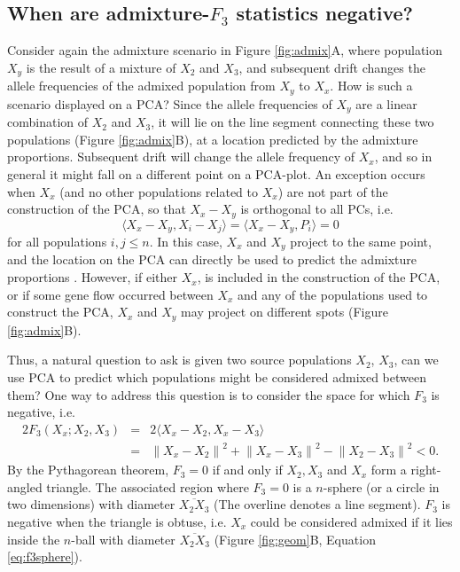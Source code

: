 \documentclass[12pt,fullpage, a4paper]{article}
\newcommand{\normsq}[1]{\left\lVert#1\right\rVert^2}
\begin{document}
\subsection{When are admixture-$F_3$ statistics negative?}
Consider again the admixture scenario in Figure \ref{fig:admix}A, where population $X_y$ is the result of a mixture of $X_2$ and $X_3$, and subsequent drift changes the allele frequencies of the admixed population from $X_y$ to $X_x$. How is such a scenario displayed on a PCA?  Since the allele frequencies of $X_y$ are a linear combination of $X_2$ and $X_3$, it will lie on the line segment connecting these two populations (Figure \ref{fig:admix}B), at a location predicted by the admixture proportions. Subsequent drift will change the allele frequency of $X_x$, and so in general it might fall on a different point on a PCA-plot. An exception occurs when $X_x$ (and no other populations related to $X_x$) are not part of the construction of the PCA, so that $X_x - X_y$ is orthogonal to all PCs, i.e. $$\langle X_x - X_y, X_i - X_j \rangle = \langle X_x - X_y, P_i \rangle = 0$$ for all populations $i,j \leq n$. In this case, $X_x$ and $X_y$ project to the same point, and the location on the PCA  can directly be used to predict the admixture proportions \citep{mcvean2009, brisbin2012, oteo-garcia2021}. However, if either $X_x$, is included in the construction of the PCA, or if some gene flow occurred between $X_x$ and any of the populations used to construct the PCA, $X_x$ and $X_y$ may project on different spots (Figure \ref{fig:admix}B). 

Thus, a natural question to ask is given two source populations $X_2$, $X_3$, can we use PCA to predict which populations might be considered admixed between them? One way to address this question is to consider the space for which $F_3$ is negative, i.e. 
\begin{eqnarray}
2 F_3(X_x; X_2, X_3) &=& 2\langle  X_x - X_2, X_x - X_3 \rangle \nonumber\\
      &=& \normsq{X_x - X_2} + \normsq{X_x - X_3}  - \normsq{X_2 - X_3} < 0 \label{eq:f3neg}\text{.}
\end{eqnarray}
By the Pythagorean theorem, $F_3 = 0 $ if and only if $X_2, X_3$ and $X_x$ form a right-angled triangle. The associated region where $F_3=0$ is a $n$-sphere (or a circle in two dimensions) with diameter $\overline{X_2X_3}$ (The overline denotes a line segment). $F_3$ is negative when the triangle is obtuse, i.e. $X_x$ could be considered admixed if it lies inside the $n$-ball with diameter $\overline{X_2X_3}$ (Figure \ref{fig:geom}B, Equation \ref{eq:f3sphere}). 
\end{document}
